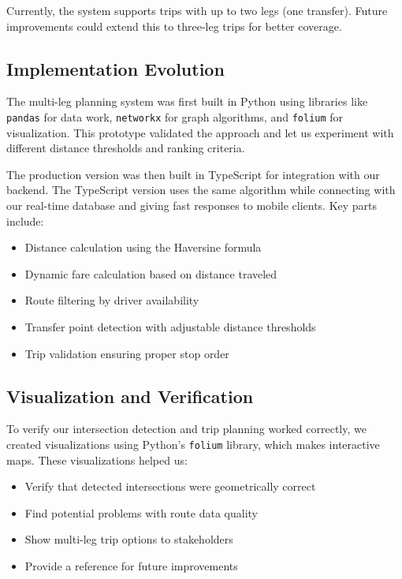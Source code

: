 \documentclass[a4paper,12pt]{article}
\begin{document}
Currently, the system supports trips with up to two legs (one transfer). Future improvements could extend this to three-leg trips for better coverage.

\subsection{Implementation Evolution}
The multi-leg planning system was first built in Python using libraries like \texttt{pandas} for data work, \texttt{networkx} for graph algorithms, and \texttt{folium} for visualization. This prototype validated the approach and let us experiment with different distance thresholds and ranking criteria.

The production version was then built in TypeScript for integration with our backend. The TypeScript version uses the same algorithm while connecting with our real-time database and giving fast responses to mobile clients. Key parts include:

\begin{itemize}
\item Distance calculation using the Haversine formula
\item Dynamic fare calculation based on distance traveled
\item Route filtering by driver availability
\item Transfer point detection with adjustable distance thresholds
\item Trip validation ensuring proper stop order
\end{itemize}

\subsection{Visualization and Verification}
To verify our intersection detection and trip planning worked correctly, we created visualizations using Python's \texttt{folium} library, which makes interactive maps. These visualizations helped us:

\begin{itemize}
\item Verify that detected intersections were geometrically correct
\item Find potential problems with route data quality
\item Show multi-leg trip options to stakeholders
\item Provide a reference for future improvements
\end{itemize}
\end{document}
